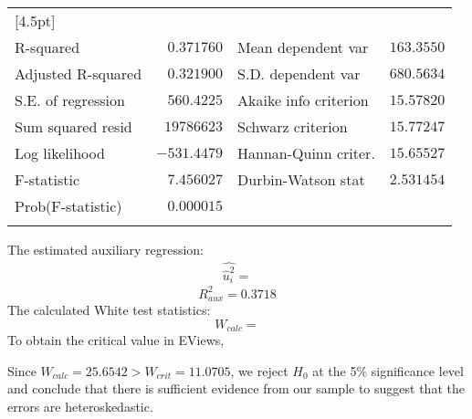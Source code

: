 \documentclass[12pt]{report}
\begin{document}
\begin{table}[H]
\begin{tabular}{lrrrr}
		[4.5pt] \hline \\ [-4.5pt]
		\multicolumn{1}{l}{R-squared}&\multicolumn{1}{r}{$0.371760$}&\multicolumn{2}{l}{Mean dependent var}&\multicolumn{1}{r}{$163.3550$}\\
		\multicolumn{1}{l}{Adjusted R-squared}&\multicolumn{1}{r}{$0.321900$}&\multicolumn{2}{l}{S.D. dependent var}&\multicolumn{1}{r}{$680.5634$}\\
		\multicolumn{1}{l}{S.E. of regression}&\multicolumn{1}{r}{$560.4225$}&\multicolumn{2}{l}{Akaike info criterion}&\multicolumn{1}{r}{$15.57820$}\\
		\multicolumn{1}{l}{Sum squared resid}&\multicolumn{1}{r}{$19786623$}&\multicolumn{2}{l}{Schwarz criterion}&\multicolumn{1}{r}{$15.77247$}\\
		\multicolumn{1}{l}{Log likelihood}&\multicolumn{1}{r}{$-531.4479$}&\multicolumn{2}{l}{Hannan-Quinn criter.}&\multicolumn{1}{r}{$15.65527$}\\
		\multicolumn{1}{l}{F-statistic}&\multicolumn{1}{r}{$7.456027$}&\multicolumn{2}{l}{Durbin-Watson stat}&\multicolumn{1}{r}{$2.531454$}\\
		\multicolumn{1}{l}{Prob(F-statistic)}&\multicolumn{1}{r}{$0.000015$}&\multicolumn{1}{c}{}&\multicolumn{1}{c}{}&\multicolumn{1}{c}{}\\
		[4.5pt] \hline \\ [-4.5pt]
	\end{tabular}
\end{table}
\vspace{-\baselineskip} \noindent The estimated auxiliary regression:
\begin{align*}
	\widehat{\hat{u}^2_i} =
\end{align*}
$$R^2_{aux} = 0.3718$$ The calculated White test statistics:
$$W_{calc} = $$ \noindent To obtain the critical value in EViews,
\begin{figure}[H]
	\centering
\end{figure}
\vspace{-\baselineskip}
\begin{figure}[H]
	\centering
\end{figure}
\vspace{-\baselineskip}

\noindent Since $W_{calc} = 25.6542 > W_{crit} = 11.0705$, we reject $H_0$ at the 5\% significance level and conclude that there is sufficient evidence from our sample to suggest that the errors are heteroskedastic.
\end{document}
